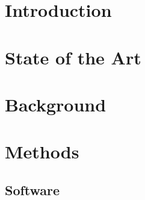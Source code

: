 \documentclass  [
  paper    = a4,
  BCOR     = 10mm,
  twoside,
  fontsize = 12pt,
  toc      = bibnumbered,
  toc      = listofnumbered,
  numbers  = noendperiod,
  headings = normal,
  listof   = leveldown,
  version  = 3.03
]                                       {scrreprt}
\begin{document}
  

  \tableofcontents
  
  \chapter{Introduction}
    
  \chapter{State of the Art}
  \label{sec::2_sota}
    
  \chapter{Background}
  
   
  \chapter{Methods}
  \section{Software}
  
\end{document}
